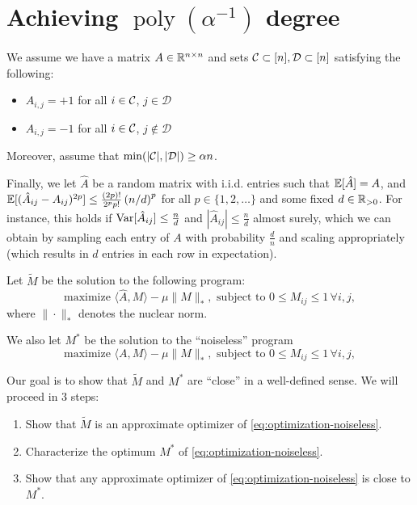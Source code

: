 \documentclass[11pt]{article}
\newcommand{\M}{\tilde{M}}
\newcommand{\A}{\hat{A}}
\DeclareMathOperator{\poly}{poly}
\newcommand{\sD}{\mathcal{D}}
\begin{document}
\section{Achieving $\poly(\alpha^{-1})$ degree}
We assume we have a matrix $A \in \mathbb{R}^{n \times n}$ and sets 
$\sC \subset [n], \sD \subset [n]$ satisfying the following:
\begin{itemize}
\item $A_{i,j} = +1$ for all $i \in \mathcal{C}$, $j \in \sD$
\item $A_{i,j} = -1$ for all $i \in \mathcal{C}$, $j \not\in \sD$
\end{itemize}
Moreover, assume that $\min(|\sC|, |\sD|) \geq \alpha n$.

Finally, we let $\A$ be a random matrix with i.i.d. entries such that $\bE[\A] = A$, 
and $\bE[(\A_{ij}-A_{ij})^{2p}] \leq \frac{(2p)!}{2^pp!} \p{n/d}^{p}$ for all $p \in \{1,2,\ldots\}$ 
and some fixed $d \in \mathbb{R}_{>0}$. For instance, this holds if $\Var[\A_{ij}] \leq \frac{n}{d}$ and $|\A_{ij}| \leq \frac{n}{d}$ almost surely, 
which we can obtain by sampling each entry of $A$ with probability $\frac{d}{n}$ and scaling appropriately (which results in $d$ entries in 
each row in expectation).

Let $\M$ be the solution to the following program:
\begin{equation}
\label{eq:optimization-noisy}
\text{maximize } \langle \A, M \rangle - \mu \|M\|_*, \text{ subject to } 0 \leq M_{ij} \leq 1 \, \forall i,j,
\end{equation}
where $\|\cdot\|_*$ denotes the nuclear norm.

We also let $M^*$ be the solution to the ``noiseless'' program
\begin{equation}
\label{eq:optimization-noiseless}
\text{maximize } \langle A, M \rangle - \mu \|M\|_*, \text{ subject to } 0 \leq M_{ij} \leq 1 \, \forall i,j,
\end{equation}

Our goal is to show that $\M$ and $M^*$ are ``close'' in a well-defined sense. We 
will proceed in $3$ steps:
\begin{enumerate}
\item Show that $\M$ is an approximate optimizer of \eqref{eq:optimization-noiseless}.
\item Characterize the optimum $M^*$ of \eqref{eq:optimization-noiseless}.
\item Show that any approximate optimizer of \eqref{eq:optimization-noiseless} is close to $M^*$.
\end{enumerate}
\end{document}
